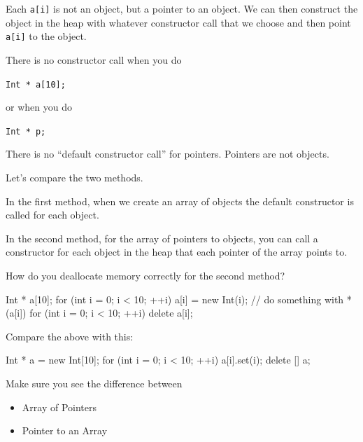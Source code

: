  Each \texttt{a[i]} is not an object, but a pointer
to an object. We can then construct the object in the heap with whatever
constructor call that we choose and then point \texttt{a[i]} to the
object.

There is no constructor call when you do
\begin{center}
\texttt{Int * a[10];}
\end{center}
or when you do
\begin{center}
\texttt{Int * p;}
\end{center}
 There is no ``default constructor call'' for
pointers. Pointers are not objects.

Let's compare the two methods.

In the first method, when we create an array of objects the default
constructor is called for each object.

In the second method, for the array of pointers to objects, you can call
a constructor for each object in the heap that each pointer of the array
points to.

How do you deallocate memory correctly for the second method?

\begin{console}
Int * a[10];
for (int i = 0; i < 10; ++i)
    a[i] = new Int(i);
// do something with *(a[i])
for (int i = 0; i < 10; ++i)
    delete a[i];
\end{console}
Compare the above with this:
\begin{console}
Int * a = new Int[10];
for (int i = 0; i < 10; ++i)
    a[i].set(i);
delete [] a;
\end{console}
Make sure you see the difference between

\begin{itemize}
\item
  Array of Pointers
\item
  Pointer to an Array
\end{itemize}

